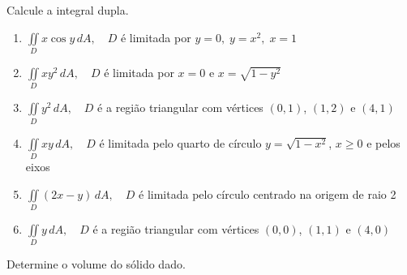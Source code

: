 	\vspace{5mm}
	
	Calcule a integral dupla.
	
	\begin{enumerate}[resume]
	
		\item $\displaystyle \iint \limits_{D} x \cos y \, dA, \quad D$ é limitada por $y = 0, \; y = x^2, \; x = 1$
		
		\item $\displaystyle \iint \limits_{D} xy^2 \, dA, \quad D$ é limitada por $x = 0$ e $x = \sqrt{1 - y^2}$
		
		\item $\displaystyle \iint \limits_{D} y^2 \, dA, \quad D$ é a região triangular com vértices $(0,1)$, $(1,2)$ e $(4,1)$
		
		\item $\displaystyle \iint \limits_{D} xy \, dA, \quad D$ é limitada pelo quarto de círculo $y = \sqrt{1 - x^2}$, $x \geq 0$ e pelos eixos
		
		\item $\displaystyle \iint \limits_{D} (2x - y) \, dA, \quad D$ é limitada pelo círculo centrado na origem de raio 2
		
		\item $\displaystyle \iint \limits_{D} y \, dA, \quad D$ é a região triangular com vértices $(0,0)$, $(1,1)$ e $(4,0)$
	
	\end{enumerate}
	
	\vspace{5mm}
	
	Determine o volume do sólido dado.
	
